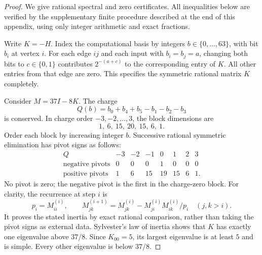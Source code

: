 \documentclass[reqno]{amsart}
\theoremstyle{definition}
\theoremstyle{remark}
\begin{document}
\begin{proof}
We give rational spectral and zero certificates. All inequalities
below are verified by the supplementary finite procedure described
at the end of this appendix, using only integer arithmetic and exact fractions.

Write $K=-H$. Index the computational basis by integers
$b\in\{0,\ldots,63\}$, with bit $b_i$ at vertex $i$.
For each edge $ij$ and each input with $b_i=b_j=a$, changing both
bits to $c\in\{0,1\}$ contributes $2^{-(a+c)}$ to the corresponding
entry of $K$. All other entries from that edge are zero.
This specifies the symmetric rational matrix $K$ completely.

Consider $M=37I-8K$. The charge
\[
 Q(b)=b_0+b_4+b_5-b_1-b_2-b_3
\]
is conserved. In charge order $-3,-2,\ldots,3$, the block dimensions are
\[
 1,\ 6,\ 15,\ 20,\ 15,\ 6,\ 1.
\]
Order each block by increasing integer $b$.
Successive rational symmetric elimination has pivot
signs as follows:
\[
\begin{array}{c|rrrrrrr}
 Q&-3&-2&-1&0&1&2&3\\ \hline
 \text{negative pivots}&0&0&0&1&0&0&0\\
 \text{positive pivots}&1&6&15&19&15&6&1.
\end{array}
\]
No pivot is zero; the negative pivot is the first in the charge-zero
block. For clarity, the recurrence at step $i$ is
\[
 p_i=M^{(i)}_{ii},\qquad
 M^{(i+1)}_{jk}
 =M^{(i)}_{jk}-M^{(i)}_{ji}M^{(i)}_{ik}/p_i
 \quad(j,k>i).
\]
It proves the stated inertia by exact rational comparison, rather
than taking the pivot signs as external data.
Sylvester's law of inertia shows that $K$ has exactly one
eigenvalue above $37/8$. Since $K_{00}=5$, its largest eigenvalue
is at least $5$ and is simple. Every other eigenvalue is below
$37/8$.


\end{proof}
\end{document}
